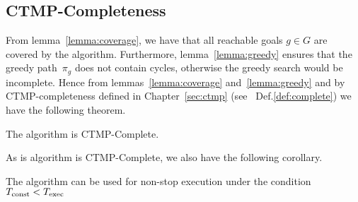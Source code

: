 \documentclass[a4paper]{report}
\begin{document}

\subsection{CTMP-Completeness}
From lemma~\ref{lemma:coverage}, we have that all reachable goals $g \in G$ are covered by the algorithm.
%
Furthermore, lemma~\ref{lemma:greedy} ensures that the greedy path~$\pi_g$ does not contain cycles, otherwise the greedy search would be incomplete. Hence from lemmas~\ref{lemma:coverage} and~\ref{lemma:greedy} and by CTMP-completeness defined in Chapter~\ref{sec:ctmp} (see ~Def.\ref{def:complete}) we have the following theorem.

\vspace{2mm}
\begin{theorem}
	The algorithm is CTMP-Complete.
\end{theorem}

As is algorithm is CTMP-Complete, we also have the following corollary.

\vspace{2mm}
\begin{cor}
	The algorithm can be used for non-stop execution under the condition~$T_{\textrm{const}} < T_{\textrm{exec}}$
\end{cor}
\end{document}
